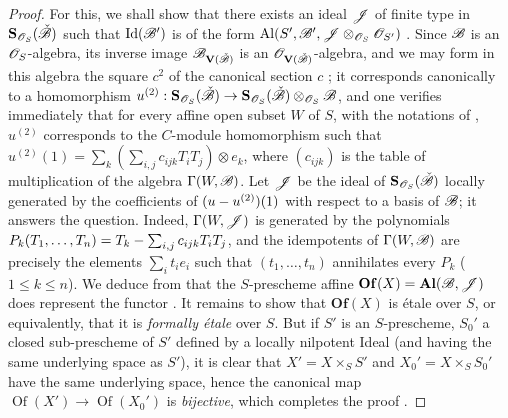\begin{proof}
For this, we shall show that there exists an ideal $\mathscr{J}$ of finite type in $\mathbf{S}_{\mathscr{O}_S}(\check{\mathscr{B}})$ such that $\operatorname{Id}(\mathscr{B}')$ is of the form $\mathrm{Al}(S',\mathscr{B}',\mathscr{J}\otimes_{\mathscr{O}_S}\mathscr{O}_{S'})$ .
Since $\mathscr{B}$ is an $\mathscr{O}_S$-algebra, its inverse image $\mathscr{B}_{\mathbf{V}(\check{\mathscr{B}})}$ is an $\mathscr{O}_{\mathbf{V}(\check{\mathscr{B}})}$-algebra, and we may form in this algebra the square $c^2$ of the canonical section $c$ ;
it corresponds canonically to a homomorphism $u^{(2)}:\mathbf{S}_{\mathscr{O}_S}(\check{\mathscr{B}})\to\mathbf{S}_{\mathscr{O}_S}(\check{\mathscr{B}})\otimes_{\mathscr{O}_S}\mathscr{B}$, and one verifies immediately that for every affine open subset $W$ of $S$, with the notations of , $u^{(2)}$ corresponds to the $C$-module homomorphism such that $u^{(2)}(1)=\sum_k(\sum_{i,j}c_{ijk}T_iT_j)\otimes e_k$, where $(c_{ijk})$ is the table of multiplication of the algebra $\Gamma(W,\mathscr{B})$.
Let $\mathscr{J}$ be the ideal of $\mathbf{S}_{\mathscr{O}_S}(\check{\mathscr{B}})$ locally generated by the coefficients of $(u- u^{(2)})(1)$ with respect to a basis of $\mathscr{B}$; it answers the question.
Indeed, $\Gamma(W,\mathscr{J})$ is generated by the polynomials $P_k(T_1,\ldots,T_n)=T_k-\sum_{i,j}c_{ijk}T_iT_j$, and the idempotents of $\Gamma(W,\mathscr{B})$ are precisely the elements $\sum_i t_i e_i$ such that $(t_1,\ldots,t_n)$ annihilates every $P_k$ ($1\leq k\leq n$).
We deduce from  that the $S$-prescheme affine $\mathbf{Of}(X)=\mathbf{Al}(\mathscr{B},\mathscr{J})$ does represent the functor .
It remains to show that $\mathbf{Of}(X)$ is \'etale over $S$, or equivalently, that it is \emph{formally \'etale} over $S$.
But if $S'$ is an $S$-prescheme, $S_0'$ a closed sub-prescheme of $S'$ defined by a locally nilpotent Ideal (and having the same underlying space as $S'$), it is clear that $X'=X\times_S S'$ and $X_0'=X\times_S S_0'$ have the same underlying space, hence the canonical map $\operatorname{Of}(X')\to\operatorname{Of}(X_0')$ is \emph{bijective}, which completes the proof .
\end{proof}

